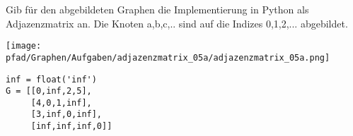 ﻿\question[4]
Gib für den abgebildeten Graphen die Implementierung in Python als Adjazenzmatrix an.
Die Knoten a,b,c,.. sind auf die Indizes 0,1,2,... abgebildet.

\texttt{[image: \\pfad/Graphen/Aufgaben/adjazenzmatrix\_05a/adjazenzmatrix\_05a.png]}
\begin{solutionbox}{5cm}
\begin{lstlisting}
inf = float('inf')
G = [[0,inf,2,5],
     [4,0,1,inf],
     [3,inf,0,inf],
     [inf,inf,inf,0]]

\end{lstlisting}
\end{solutionbox}
